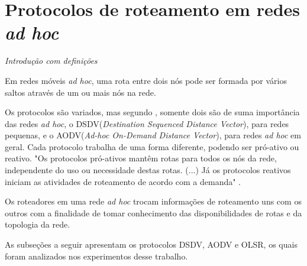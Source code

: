 \section{Protocolos de roteamento em redes \textit{ad hoc}}

\textit{Introdu\c{c}\~ao com defini\c{c}\~oes}

Em redes m\'oveis \textit{ad hoc}, uma rota entre dois n\'os pode ser formada por v\'arios saltos atrav\'es de um ou mais n\'os na rede. 

Os protocolos s\~ao variados, mas segundo \cite{gorantala}, somente dois s\~ao de suma import\^ancia das redes \textit{ad hoc}, o DSDV(\textit{Destination Sequenced Distance Vector}), para redes pequenas, e o AODV(\textit{Ad-hoc On-Demand Distance Vector}), para redes \textit{ad hoc} em geral. 
Cada protocolo trabalha de uma forma diferente, podendo ser pr\'o-ativo ou reativo. 
"Os protocolos pr\'o-ativos mant\^em rotas para todos os n\'os da rede, independente do uso ou necessidade destas rotas. (...) J\'a os protocolos reativos iniciam as atividades de roteamento de acordo com a demanda" \cite{pereira}.

Os roteadores em uma rede \textit{ad hoc} trocam informa\c{c}\~oes de roteamento uns com os outros com a finalidade de tomar conhecimento das disponibilidades de rotas e da topologia da rede.\cite{pereira}

As subse\c{c}\~oes a seguir apresentam os protocolos DSDV, AODV e OLSR, os quais foram analizados nos experimentos desse trabalho.

